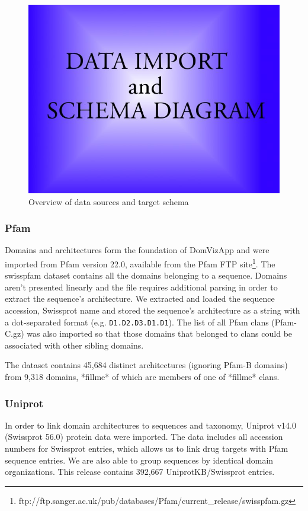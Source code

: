 \begin{figure}[h]
 \begin{center}
 \includegraphics[scale=0.5]{figures/placeholder_dataimport.jpg}
 \end{center}
 \caption{Overview of data sources and target schema}
 \label{dataimport}
\end{figure}

\subsubsection{Pfam}
Domains and architectures form the foundation of DomVizApp and were imported from Pfam version 22.0, available from the Pfam FTP site\footnote{ftp://ftp.sanger.ac.uk/pub/databases/Pfam/current\_release/swisspfam.gz}. The swisspfam dataset contains all the domains belonging to a sequence. Domains aren't presented linearly and the file requires additional parsing in order to extract the sequence's architecture. We extracted and loaded the sequence accession, Swissprot name and stored the sequence's architecture as a string with a dot-separated format (e.g. \texttt{D1.D2.D3.D1.D1}). The list of all Pfam clans (Pfam-C.gz) was also imported so that those domains that belonged to clans could be associated with other sibling domains. 

The dataset contains 45,684 distinct architectures (ignoring Pfam-B domains) from 9,318 domains, *fillme* of which are members of one of *fillme* clans.

\subsubsection{Uniprot}
In order to link domain architectures to sequences and taxonomy, Uniprot v14.0 (Swissprot 56.0) protein data were imported. The data includes all accession numbers for Swissprot entries, which allows us to link drug targets with Pfam sequence entries. We are also able to group sequences by identical domain organizations. This release contains 392,667 UniprotKB/Swissprot entries. %

